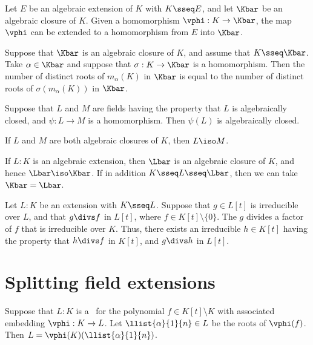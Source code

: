 \documentclass{article}
\begin{document}
  \begin{ttheorem}
    Let $E$ be an algebraic extension of $K$ with $K\sseq E$, and let $\Kbar$ be an algebraic closure of $K$. Given a homomorphism $\vphi:K\to \Kbar$, the map $\vphi$ can be extended to a homomorphism from $E$ into $\Kbar$.
  \end{ttheorem}

  \begin{tcorollary}
    Suppose that $\Kbar$ is an algebraic closure of $K$, and assume that $K\sseq \Kbar$. Take $\alpha\in \Kbar$ and suppose that $\sigma:K\to \Kbar$ is a homomorphism. Then the number of distinct roots of $m_\alpha(K)$ in $\Kbar$ is equal to the number of distinct roots of $\sigma(m_\alpha(K))$ in $\Kbar$.
  \end{tcorollary}

  \begin{tproposition}
    Suppose that $L$ and $M$ are fields having the property that $L$ is algebraically closed, and $\psi : L \to M $ is a homomorphism. Then $\psi(L)$ is algebraically closed.
  \end{tproposition}

  \begin{tproposition}
    If $L$ and $M$ are both algebraic closures of $K$, then $L \iso M$.
  \end{tproposition}

  \begin{tproposition}
    If $L:K$ is an algebraic extension, then $\Lbar$ is an algebraic closure of $K$, and hence $\Lbar\iso\Kbar$. If in addition $K\sseq L\sseq \Lbar$, then we can take $\Kbar = \Lbar$.
  \end{tproposition}

  \begin{tproposition}
    Let $L:K$ be an extension with $K\sseq L$. Suppose that $g\in L[t]$ is irreducible over $L$, and that $g\divs f$ in $L[t]$, where $f\in K[t]\setminus \{ 0 \}$. The $g$ divides a factor of $f$ that is irreducible over $K$. Thus, there exists an irreducible $h\in K[t]$ having the property that $h\divs f$ in $K[t]$, and $g\divs h$ in $L[t]$.
  \end{tproposition}

\section{Splitting field extensions}
  \begin{tproposition}
    Suppose that $L:K$ is a \sfe~for the polynomial $f\in K[t]\setminus K$ with associated embedding $\vphi:K\to L$. Let $\llist{\alpha}{1}{n}\in L$ be the roots of $\vphi(f)$. Then $L=\vphi(K)(\llist{\alpha}{1}{n})$.
  \end{tproposition}
\end{document}
